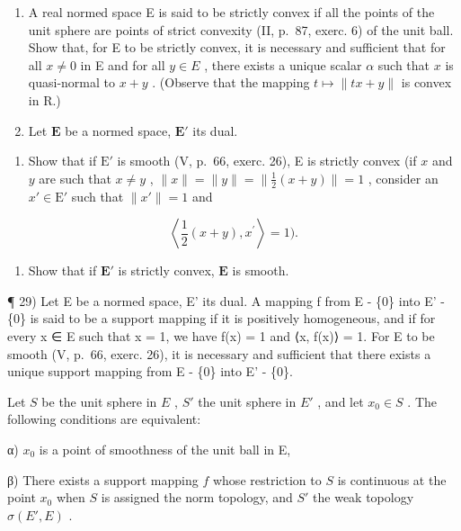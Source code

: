 \begin{enumerate}
\def\labelenumi{\arabic{enumi})}
\setcounter{enumi}{26}
\item
  A real normed space E is said to be strictly convex if all the points of the unit sphere are points of strict convexity (II, p.~87, exerc. 6) of the unit ball. Show that, for E to be strictly convex, it is necessary and sufficient that for all \(x \neq 0\) in E and for all \(y \in E\) , there exists a unique scalar \(\alpha\) such that \(x\) is quasi-normal to \(x + y\) . (Observe that the mapping \(t \mapsto \| tx + y \|\) is convex in R.)
\item
  Let \(\mathbf{E}\) be a normed space, \(\mathbf{E}'\) its dual.
\end{enumerate}

\begin{enumerate}
\def\labelenumi{\alph{enumi})}
\tightlist
\item
  Show that if \(\mathrm{E}'\) is smooth (V, p.~66, exerc. 26), E is strictly convex (if \(x\) and \(y\) are such that \(x \neq y\) , \(\| x \| = \| y \| = \| \frac{1}{2}(x + y) \| = 1\) , consider an \(x' \in \mathrm{E}'\) such that \(\| x' \| = 1\) and
\end{enumerate}

\[
\left\langle \frac {1}{2} (x + y), x ^ {\prime} \right\rangle = 1).
\]

\begin{enumerate}
\def\labelenumi{\alph{enumi})}
\setcounter{enumi}{1}
\tightlist
\item
  Show that if \(\mathbf{E}'\) is strictly convex, \(\mathbf{E}\) is smooth.
\end{enumerate}

¶ 29) Let E be a normed space, E' its dual. A mapping f from E - \{0\} into E' - \{0\} is said to be a support mapping if it is positively homogeneous, and if for every x ∈ E such that \textbar\textbar x\textbar\textbar{} = 1, we have \textbar\textbar f(x)\textbar\textbar{} = 1 and ⟨x, f(x)⟩ = 1. For E to be smooth (V, p.~66, exerc. 26), it is necessary and sufficient that there exists a unique support mapping from E - \{0\} into E' - \{0\}.

Let \(S\) be the unit sphere in \(E\) , \(S'\) the unit sphere in \(E'\) , and let \(x_0 \in S\) . The following conditions are equivalent:

α) \(x_{0}\) is a point of smoothness of the unit ball in E,

β) There exists a support mapping \(f\) whose restriction to \(S\) is continuous at the point \(x_0\) when \(S\) is assigned the norm topology, and \(S'\) the weak topology \(\sigma(E', E)\) .

